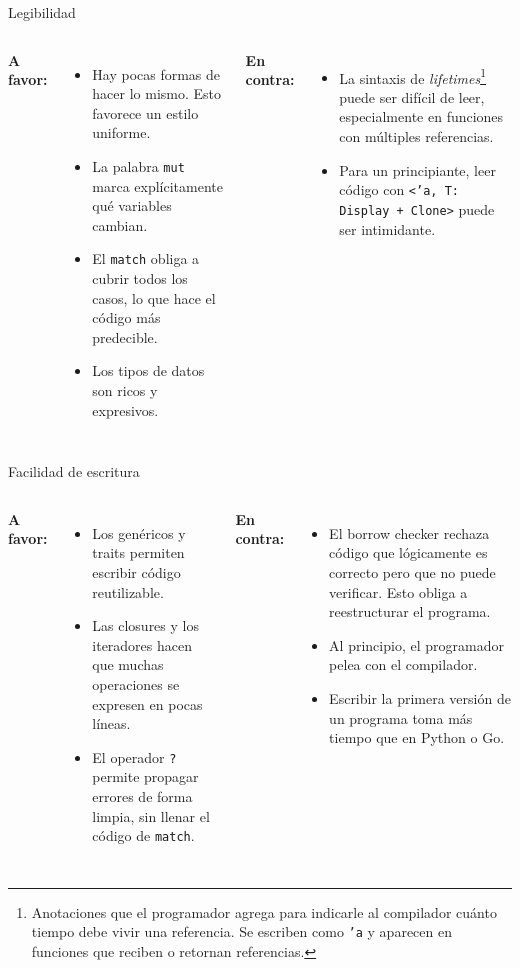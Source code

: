 \documentclass[11pt, aspectratio=169]{beamer}
\begin{document}
	\begin{frame}{Legibilidad}
		\begin{columns}
			\textbf{A favor:}
			\begin{itemize}
				\item Hay pocas formas de hacer lo mismo. Esto favorece un estilo uniforme.
				\item La palabra \texttt{mut} marca explícitamente qué variables cambian.
				\item El \texttt{match} obliga a cubrir todos los casos, lo que hace el código más predecible.
				\item Los tipos de datos son ricos y expresivos.
			\end{itemize}
			
			\textbf{En contra:}
			\begin{itemize}
				\item La sintaxis de \textit{lifetimes}\footnote{Anotaciones que el programador agrega para indicarle al compilador cuánto tiempo debe vivir una referencia. Se escriben como \texttt{'a} y aparecen en funciones que reciben o retornan referencias.} puede ser difícil de leer, especialmente en funciones con múltiples referencias.
				\item Para un principiante, leer código con \texttt{<'a, T: Display + Clone>} puede ser intimidante.
			\end{itemize}
		\end{columns}
	\end{frame}

	\begin{frame}{Facilidad de escritura}
		\begin{columns}
			\column{0.5\textwidth}
			\textbf{A favor:}
			\begin{itemize}
				\item Los genéricos y traits permiten escribir código reutilizable.
				\item Las closures y los iteradores hacen que muchas operaciones se expresen en pocas líneas.
				\item El operador \texttt{?} permite propagar errores de forma limpia, sin llenar el código de \texttt{match}.
			\end{itemize}
			
			\column{0.5\textwidth}
			\textbf{En contra:}
			\begin{itemize}
				\item El borrow checker rechaza código que lógicamente es correcto pero que no puede verificar. Esto obliga a reestructurar el programa.
				\item Al principio, el programador pelea con el compilador.
				\item Escribir la primera versión de un programa toma más tiempo que en Python o Go.
			\end{itemize}
		\end{columns}
	\end{frame}
\end{document}
